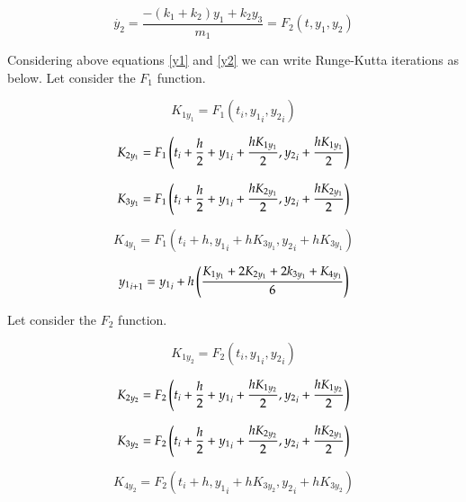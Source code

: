 \begin{equation}
\label{y2}
    \dot{y_2} = \frac{-(k_1+k_2)y_1+k_2y_3}{m_1} = F_2(t,y_1,y_2)
\end{equation}

Considering above equations \eqref{y1} and \eqref{y2} we can write Runge-Kutta iterations as below. Let consider the $F_1$ function. 


\begin{equation}
    {K_{1y_1}} = F_1(t_i,{y_1}_i,{y_2}_i)
\end{equation}

\begin{equation}
    {K_{2y_1}} = F_1\left( {{t_i}+\frac{h}{2} + {y_1}_i+{h K_{1y_1} \over 2},{y_2}_i + {h K_{1y_1} \over 2}} \right)
\end{equation}

\begin{equation}
    {K_{3y_1}} = F_1\left( {{t_i}+\frac{h}{2} + {y_1}_i+{h K_{2y_1} \over 2},{y_2}_i + {h K_{2y_1} \over 2}} \right)
\end{equation}

\begin{equation}
    {K_{4y_1}} = F_1\left( {{t_i}+h, {y_1}_i+{h K_{3y_1}},{y_2}_i + {h K_{3y_1}}} \right)
\end{equation}

\begin{equation}
    {y_1}_{i+1} = {y_1}_i +h \left( K_{1y_1}+ 2K_{2y_1} + 2k_{3y_1} +K_{4y_1}  \over 6 \right)
\end{equation}

Let consider the $F_2$ function. 

\begin{equation}
    {K_{1y_2}} = F_2(t_i,{y_1}_i,{y_2}_i)
\end{equation}

\begin{equation}
    {K_{2y_2}} = F_2\left( {{t_i}+\frac{h}{2} + {y_1}_i+{h K_{1y_2} \over 2},{y_2}_i + {h K_{1y_2} \over 2}} \right)
\end{equation}

\begin{equation}
    {K_{3y_2}} = F_2\left( {{t_i}+\frac{h}{2} + {y_1}_i+{h K_{2y_2} \over 2},{y_2}_i + {h K_{2y_1} \over 2}} \right)
\end{equation}

\begin{equation}
    {K_{4y_2}} = F_2\left( {{t_i}+h, {y_1}_i+{h K_{3y_2}},{y_2}_i + {h K_{3y_2}}} \right)
\end{equation}

